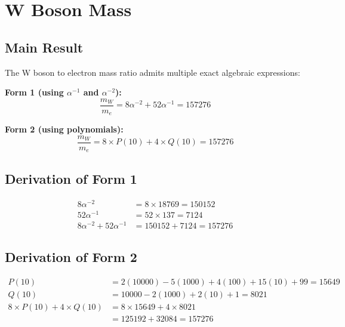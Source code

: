 \documentclass[11pt,a4paper]{article}
\begin{document}
\section{W Boson Mass}

\subsection{Main Result}

\begin{theorem}
The W boson to electron mass ratio admits multiple exact algebraic expressions:

\textbf{Form 1 (using $\alpha^{-1}$ and $\alpha^{-2}$):}
\begin{equation}
\boxed{\frac{m_W}{m_e} = 8\alpha^{-2} + 52\alpha^{-1} = 157276}
\end{equation}

\textbf{Form 2 (using polynomials):}
\begin{equation}
\frac{m_W}{m_e} = 8 \times P(10) + 4 \times Q(10) = 157276
\end{equation}
\end{theorem}

\subsection{Derivation of Form 1}

\begin{align}
8\alpha^{-2} &= 8 \times 18769 = 150152 \\
52\alpha^{-1} &= 52 \times 137 = 7124 \\
8\alpha^{-2} + 52\alpha^{-1} &= 150152 + 7124 = 157276
\end{align}

\subsection{Derivation of Form 2}

\begin{align}
P(10) &= 2(10000) - 5(1000) + 4(100) + 15(10) + 99 = 15649 \\
Q(10) &= 10000 - 2(1000) + 2(10) + 1 = 8021 \\
8 \times P(10) + 4 \times Q(10) &= 8 \times 15649 + 4 \times 8021 \\
&= 125192 + 32084 = 157276
\end{align}
\end{document}
